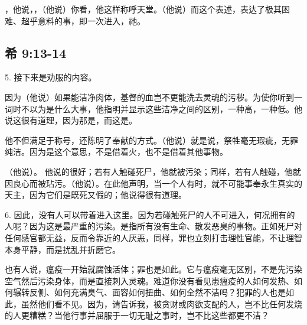 ，他说，，（他说）你看，他这样称呼天堂。（他说）而这个表述，表达了极其困难、超乎意料的事，即一次进入，祂。\par


\subsection{希 9:13-14}

5. 接下来是劝服的内容。\par

\par

因为（他说）如果能洁净肉体，基督的血岂不更能洗去灵魂的污秽。为使你听到一词时不以为是什么大事，他指明并显示这些洁净之间的区别，一种高，一种低。他说这很有道理，因为那是，而这是。\par

他不但满足于称号，还陈明了奉献的方式。（他说）就是说，祭牲毫无瑕疵，无罪纯洁。因为是这个意思，不是借着火，也不是借着其他事物。\par

（他说）。 他说的很好；若有人触碰死尸，他就被污染；同样，若有人触碰，他就因良心而被玷污。（他说）。在此他声明，当一个人有时，就不可能事奉永生真实的天主，因为它们是既死又假的；他说得很有道理。\par

6. 因此，没有人可以带着进入这里。因为若碰触死尸的人不可进入，何况拥有的人呢？因为这是最严重的污染。是指所有没有生命、散发恶臭的事物。正如死尸对任何感官都无益，反而令靠近的人厌恶，同样，罪也立刻打击理性官能，不让理智本身平静，而是扰乱并折磨它。\par

也有人说，瘟疫一开始就腐蚀活体；罪也是如此。它与瘟疫毫无区别，不是先污染空气然后污染身体，而是直接刺入灵魂。难道你没有看见患瘟疫的人如何发热、如何辗转反侧、如何充满臭气、面容如何扭曲、如何全然不洁吗？犯罪的人也是如此，虽然他们看不见。因为，请告诉我，被贪财或肉欲支配的人，岂不比任何发烧的人更糟糕？当他行事并屈服于一切无耻之事时，岂不比这些都更不洁？\par

